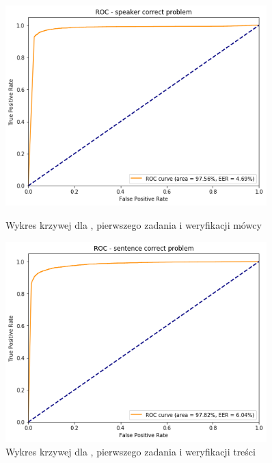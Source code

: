 \begin{figure}[H]
    \centering
    \begin{minipage}{.5\textwidth}
        \centering
        \includegraphics[width=0.9\textwidth]{images/4_3_gmm_roc_speaker}
        \caption{Wykres krzywej  dla , pierwszego zadania  i weryfikacji mówcy}
        \label{fig:4_3_gmm_roc_speaker}
    \end{minipage}%
    \begin{minipage}{.5\textwidth}
        \centering
        \includegraphics[width=0.9\textwidth]{images/4_3_gmm_roc_sentence}
        \caption{Wykres krzywej  dla , pierwszego zadania  i weryfikacji treści}
        \label{fig:4_3_gmm_roc_sentence}
    \end{minipage}
\end{figure}

